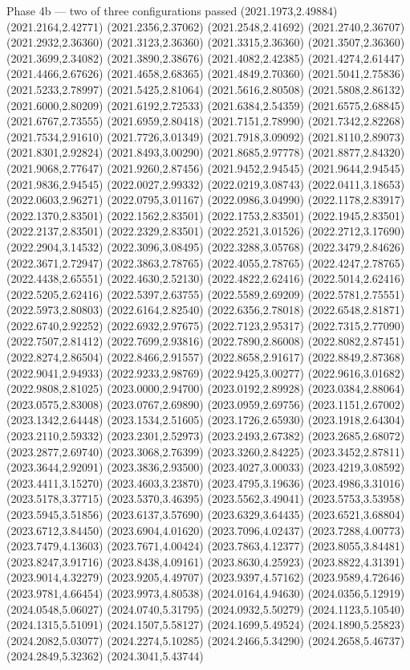 \documentclass[aspectratio=169,10pt]{beamer}
\begin{document}
\begin{frame}[t]{Phase 4b — two of three configurations passed}
(2021.1973,2.49884) (2021.2164,2.42771) (2021.2356,2.37062) (2021.2548,2.41692) (2021.2740,2.36707) (2021.2932,2.36360) (2021.3123,2.36360) (2021.3315,2.36360) (2021.3507,2.36360) (2021.3699,2.34082) (2021.3890,2.38676) (2021.4082,2.42385) (2021.4274,2.61447) (2021.4466,2.67626) (2021.4658,2.68365) (2021.4849,2.70360) (2021.5041,2.75836) (2021.5233,2.78997) (2021.5425,2.81064) (2021.5616,2.80508) (2021.5808,2.86132) (2021.6000,2.80209) (2021.6192,2.72533) (2021.6384,2.54359) (2021.6575,2.68845) (2021.6767,2.73555) (2021.6959,2.80418) (2021.7151,2.78990) (2021.7342,2.82268) (2021.7534,2.91610) (2021.7726,3.01349) (2021.7918,3.09092) (2021.8110,2.89073) (2021.8301,2.92824) (2021.8493,3.00290) (2021.8685,2.97778) (2021.8877,2.84320) (2021.9068,2.77647) (2021.9260,2.87456) (2021.9452,2.94545) (2021.9644,2.94545) (2021.9836,2.94545) (2022.0027,2.99332) (2022.0219,3.08743) (2022.0411,3.18653) (2022.0603,2.96271) (2022.0795,3.01167) (2022.0986,3.04990) (2022.1178,2.83917) (2022.1370,2.83501) (2022.1562,2.83501) (2022.1753,2.83501) (2022.1945,2.83501) (2022.2137,2.83501) (2022.2329,2.83501) (2022.2521,3.01526) (2022.2712,3.17690) (2022.2904,3.14532) (2022.3096,3.08495) (2022.3288,3.05768) (2022.3479,2.84626) (2022.3671,2.72947) (2022.3863,2.78765) (2022.4055,2.78765) (2022.4247,2.78765) (2022.4438,2.65551) (2022.4630,2.52130) (2022.4822,2.62416) (2022.5014,2.62416) (2022.5205,2.62416) (2022.5397,2.63755) (2022.5589,2.69209) (2022.5781,2.75551) (2022.5973,2.80803) (2022.6164,2.82540) (2022.6356,2.78018) (2022.6548,2.81871) (2022.6740,2.92252) (2022.6932,2.97675) (2022.7123,2.95317) (2022.7315,2.77090) (2022.7507,2.81412) (2022.7699,2.93816) (2022.7890,2.86008) (2022.8082,2.87451) (2022.8274,2.86504) (2022.8466,2.91557) (2022.8658,2.91617) (2022.8849,2.87368) (2022.9041,2.94933) (2022.9233,2.98769) (2022.9425,3.00277) (2022.9616,3.01682) (2022.9808,2.81025) (2023.0000,2.94700) (2023.0192,2.89928) (2023.0384,2.88064) (2023.0575,2.83008) (2023.0767,2.69890) (2023.0959,2.69756) (2023.1151,2.67002) (2023.1342,2.64448) (2023.1534,2.51605) (2023.1726,2.65930) (2023.1918,2.64304) (2023.2110,2.59332) (2023.2301,2.52973) (2023.2493,2.67382) (2023.2685,2.68072) (2023.2877,2.69740) (2023.3068,2.76399) (2023.3260,2.84225) (2023.3452,2.87811) (2023.3644,2.92091) (2023.3836,2.93500) (2023.4027,3.00033) (2023.4219,3.08592) (2023.4411,3.15270) (2023.4603,3.23870) (2023.4795,3.19636) (2023.4986,3.31016) (2023.5178,3.37715) (2023.5370,3.46395) (2023.5562,3.49041) (2023.5753,3.53958) (2023.5945,3.51856) (2023.6137,3.57690) (2023.6329,3.64435) (2023.6521,3.68804) (2023.6712,3.84450) (2023.6904,4.01620) (2023.7096,4.02437) (2023.7288,4.00773) (2023.7479,4.13603) (2023.7671,4.00424) (2023.7863,4.12377) (2023.8055,3.84481) (2023.8247,3.91716) (2023.8438,4.09161) (2023.8630,4.25923) (2023.8822,4.31391) (2023.9014,4.32279) (2023.9205,4.49707) (2023.9397,4.57162) (2023.9589,4.72646) (2023.9781,4.66454) (2023.9973,4.80538) (2024.0164,4.94630) (2024.0356,5.12919) (2024.0548,5.06027) (2024.0740,5.31795) (2024.0932,5.50279) (2024.1123,5.10540) (2024.1315,5.51091) (2024.1507,5.58127) (2024.1699,5.49524) (2024.1890,5.25823) (2024.2082,5.03077) (2024.2274,5.10285) (2024.2466,5.34290) (2024.2658,5.46737) (2024.2849,5.32362) (2024.3041,5.43744) 
\end{frame}
\end{document}
